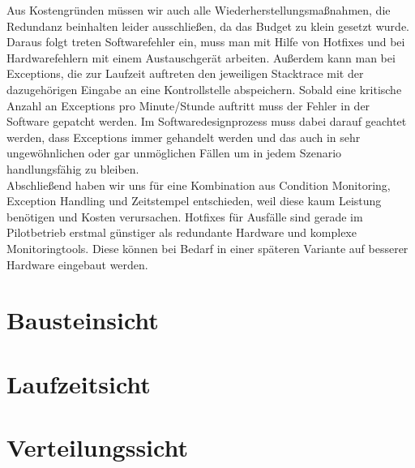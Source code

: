 Aus Kostengründen müssen wir auch alle Wiederherstellungsmaßnahmen, die Redundanz beinhalten leider ausschließen, da das Budget zu klein gesetzt wurde. Daraus folgt treten Softwarefehler ein, muss man mit Hilfe von Hotfixes und bei Hardwarefehlern mit einem Austauschgerät arbeiten. Außerdem kann man bei Exceptions, die zur Laufzeit auftreten den jeweiligen Stacktrace mit der dazugehörigen Eingabe an eine Kontrollstelle abspeichern. Sobald eine kritische Anzahl an Exceptions pro Minute/Stunde auftritt muss der Fehler in der Software gepatcht werden. Im Softwaredesignprozess muss dabei darauf geachtet werden, dass Exceptions immer gehandelt werden und das auch in sehr ungewöhnlichen oder gar unmöglichen Fällen um in jedem Szenario handlungsfähig zu bleiben.
\\
Abschließend haben wir uns für eine Kombination aus Condition Monitoring, Exception Handling und Zeitstempel entschieden, weil diese kaum Leistung benötigen und Kosten verursachen. Hotfixes für Ausfälle sind gerade im Pilotbetrieb erstmal günstiger als redundante Hardware und komplexe Monitoringtools. Diese können bei Bedarf in einer späteren Variante auf besserer Hardware eingebaut werden.
\section{Bausteinsicht}
\section{Laufzeitsicht}
\section{Verteilungssicht}